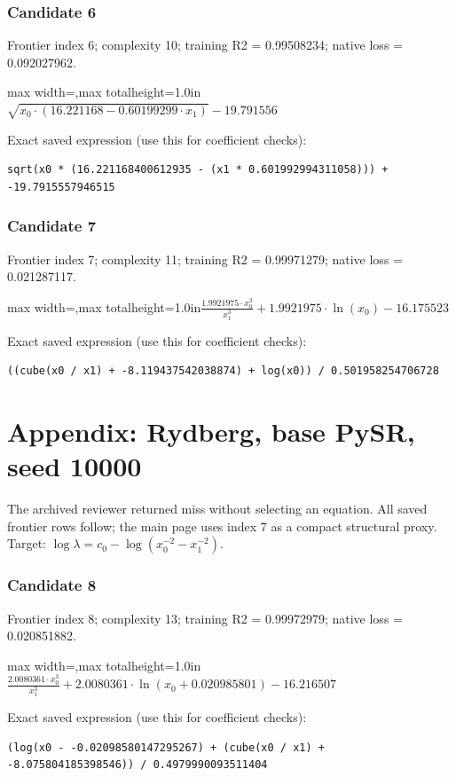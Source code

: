 \documentclass[10pt,letterpaper,landscape]{article}
\begin{document}
\subsubsection*{Candidate 6}
Frontier index 6; complexity 10; training R2 = 0.99508234; native loss = 0.092027962.
\begin{center}\begin{adjustbox}{max width=\linewidth,max totalheight=1.0in}$\displaystyle \sqrt{x_{0} \cdot \left(16.221168 - 0.60199299 \cdot x_{1}\right)} - 19.791556$\end{adjustbox}\end{center}
{\scriptsize Exact saved expression (use this for coefficient checks):}
\begin{lstlisting}
sqrt(x0 * (16.221168400612935 - (x1 * 0.601992994311058))) + -19.7915557946515
\end{lstlisting}
\subsubsection*{Candidate 7}
Frontier index 7; complexity 11; training R2 = 0.99971279; native loss = 0.021287117.
\begin{center}\begin{adjustbox}{max width=\linewidth,max totalheight=1.0in}$\displaystyle \frac{1.9921975 \cdot x_{0}^{3}}{x_{1}^{3}} + 1.9921975 \cdot \ln{\left(x_{0} \right)} - 16.175523$\end{adjustbox}\end{center}
{\scriptsize Exact saved expression (use this for coefficient checks):}
\begin{lstlisting}
((cube(x0 / x1) + -8.119437542038874) + log(x0)) / 0.501958254706728
\end{lstlisting}
\clearpage\section*{Appendix: Rydberg, base PySR, seed 10000}
The archived reviewer returned miss without selecting an equation. All saved frontier rows follow; the main page uses index 7 as a compact structural proxy. Target: $\log\lambda=c_0-\log(x_0^{-2}-x_1^{-2})$.
\subsubsection*{Candidate 8}
Frontier index 8; complexity 13; training R2 = 0.99972979; native loss = 0.020851882.
\begin{center}\begin{adjustbox}{max width=\linewidth,max totalheight=1.0in}$\displaystyle \frac{2.0080361 \cdot x_{0}^{3}}{x_{1}^{3}} + 2.0080361 \cdot \ln{\left(x_{0} + 0.020985801 \right)} - 16.216507$\end{adjustbox}\end{center}
{\scriptsize Exact saved expression (use this for coefficient checks):}
\begin{lstlisting}
(log(x0 - -0.02098580147295267) + (cube(x0 / x1) + -8.075804185398546)) / 0.4979990093511404
\end{lstlisting}
\end{document}
